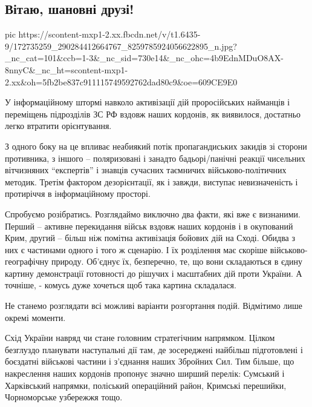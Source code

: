  
 
 
 
 

\subsection{Вітаю, шановні друзі!}

\ifcmt
  pic https://scontent-mxp1-2.xx.fbcdn.net/v/t1.6435-9/172735259_290284412664767_8259785924056622895_n.jpg?_nc_cat=101&ccb=1-3&_nc_sid=730e14&_nc_ohc=4b9EdnMDuO8AX-8nnyC&_nc_ht=scontent-mxp1-2.xx&oh=5fb2be837c911115749592762dad80c9&oe=609CE9E0
\fi

У інформаційному штормі навколо активізації дій проросійських найманців і
переміщень підрозділів ЗС РФ вздовж наших кордонів, як виявилося, достатньо
легко втратити орієнтування.

З одного боку на це впливає неабиякий потік пропагандиських  закидів зі сторони
противника, з іншого – поляризовані і занадто бадьорі/панічні реакції чисельних
вітчизняних “експертів” і знавців сучасних  таємничих військово-політичних
методик. Третім фактором дезорієнтації, як і завжди, виступає невизначеність і
протиріччя в інформаційному просторі.

Спробуємо розібратись. Розглядаймо виключно два факти, які вже є визнаними.
Перший – активне перекидання військ вздовж наших кордонів і в окупований Крим,
другий – більш ніж помітна активізація бойових дій на Сході. Обидва з них є
частинами одного і того ж сценарію. І їх розділення має скоріше
військово-географічну природу. Об’єднує їх, безперечно, те, що вони складаються
в єдину картину демонстрації готовності до рішучих і масштабних дій проти
України. А точніше, - комусь дуже хочеться щоб така картина складалася.

Не станемо розглядати всі можливі варіанти розгортання подій. Відмітимо лише окремі моменти. 

Схід України навряд чи стане головним стратегічним напрямком. Цілком безглуздо
планувати наступальні дії там, де зосереджені найбільш підготовлені і боєздатні
військові частини і з’єднання наших Збройних Сил. Тим більше, що накреслення
наших кордонів пропонує значно ширший перелік: Сумський і Харківський напрямки,
поліський операційний район, Кримські перешийки, Чорноморське узбережжя тощо. 

